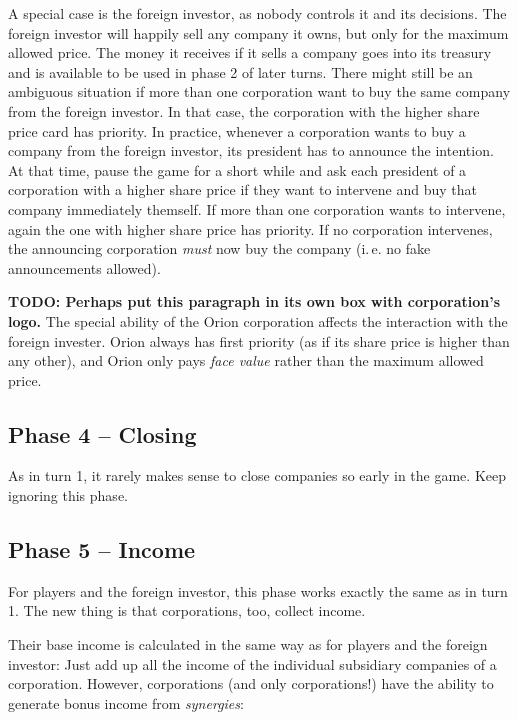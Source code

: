 \documentclass[10pt,final]{report}
\begin{document}
\begin{multicols}{2}
A special case is the foreign investor, as nobody controls it and its
decisions. The foreign investor will happily sell any company it owns,
but only for the maximum allowed price. The money it receives if it
sells a company goes into its treasury and is available to be used in
phase 2 of later turns. There might still be an ambiguous situation if
more than one corporation want to buy the same company from the
foreign investor. In that case, the corporation with the higher share
price card has priority. In practice, whenever a corporation wants to
buy a company from the foreign investor, its president has to announce
the intention. At that time, pause the game for a short while and ask
each president of a corporation with a higher share price if they want
to intervene and buy that company immediately themself. If more than
one corporation wants to intervene, again the one with higher share
price has priority. If no corporation intervenes, the announcing
corporation \emph{must} now buy the company (i.\,e. no fake
announcements allowed).

\textbf{TODO: Perhaps put this paragraph in its own box with
  corporation's logo.} The special ability of the Orion corporation
affects the interaction with the foreign invester. Orion always has
first priority (as if its share price is higher than any other), and
Orion only pays \emph{face value} rather than the maximum allowed
price.

\subsection{Phase 4 -- Closing}

As in turn 1, it rarely makes sense to close companies so
early in the game. Keep ignoring this phase.

\subsection{Phase 5 -- Income}
\label{t2p5}

For players and the foreign investor, this phase works exactly the
same as in turn 1. The new thing is that corporations, too, collect
income.

Their base income is calculated in the same way as for players and the
foreign investor: Just add up all the income of the individual
subsidiary companies of a corporation. However, corporations (and only
corporations!) have the ability to generate bonus income from
\emph{synergies}:


\end{multicols}
\end{document}
